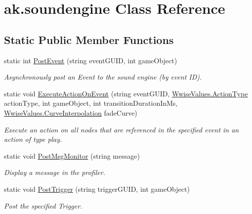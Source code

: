 \hypertarget{classak_1_1soundengine}{}\section{ak.\+soundengine Class Reference}
\label{classak_1_1soundengine}
\subsection*{Static Public Member Functions}
\begin{DoxyCompactItemize}
\item 
static int \mbox{\hyperlink{classak_1_1soundengine_a2290e4a649fce1091953eb400db9f313}{Post\+Event}} (string event\+G\+U\+ID, int game\+Object)
\begin{DoxyCompactList}\small\item\em Asynchronously post an Event to the sound engine (by event ID). \end{DoxyCompactList}\item 
static void \mbox{\hyperlink{classak_1_1soundengine_a9a535985a59833af4b6f449290f669e9}{Execute\+Action\+On\+Event}} (string event\+G\+U\+ID, \mbox{\hyperlink{class_waapi_c_s_1_1_custom_values_1_1_wwise_values_a5c261935f6f77b4260dc66ddb3e56fb7}{Wwise\+Values.\+Action\+Type}} action\+Type, int game\+Object, int transition\+Duration\+In\+Ms, \mbox{\hyperlink{class_waapi_c_s_1_1_custom_values_1_1_wwise_values_a9014a599ab2b6e81b5e841de3603244d}{Wwise\+Values.\+Curve\+Interpolation}} fade\+Curve)
\begin{DoxyCompactList}\small\item\em Execute an action on all nodes that are referenced in the specified event in an action of type play. \end{DoxyCompactList}\item 
static void \mbox{\hyperlink{classak_1_1soundengine_afd779d093ce814d15447430388a0d456}{Post\+Msg\+Monitor}} (string message)
\begin{DoxyCompactList}\small\item\em Display a message in the profiler. \end{DoxyCompactList}\item 
static void \mbox{\hyperlink{classak_1_1soundengine_ac1c88c689a398ecd9be070d12673ed97}{Post\+Trigger}} (string trigger\+G\+U\+ID, int game\+Object)
\begin{DoxyCompactList}\small\item\em Post the specified Trigger. \end{DoxyCompactList}\item 

\end{DoxyCompactItemize}
